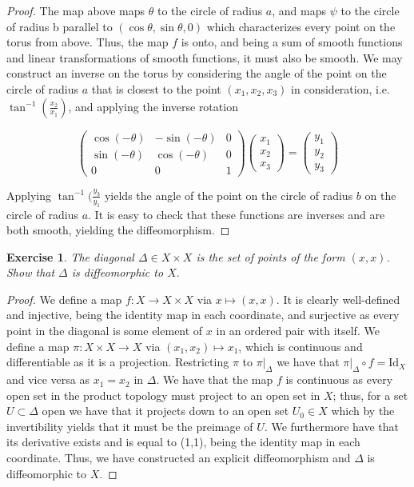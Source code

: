 \documentclass{article}
\newtheorem{exercise}{Exercise}
\begin{document}
\begin{proof}
    The map above maps $\theta$ to the circle of radius $a$, and maps $\psi$ to the circle of radius b parallel to $(\cos\theta, \sin\theta, 0)$ which characterizes every point on the torus from above. Thus, the map $f$ is onto, and being a sum of smooth functions and linear transformations of smooth functions, it must also be smooth. We may construct an inverse on the torus by considering the angle of the point on the circle of radius $a$ that is closest to the point $(x_{1},x_{2},x_{3})$ in consideration, i.e. $\tan^{-1}(\frac{x_{2}}{x_{1}})$, and applying the inverse rotation

    \[ \begin{pmatrix}  \cos(-\theta) & -\sin(-\theta) & 0 \\ \sin(-\theta) & \cos(-\theta) & 0 \\  0 & 0 & 1 \end{pmatrix} \begin{pmatrix}x_{1} \\ x_{2} \\ x_{3} \end{pmatrix} = \begin{pmatrix} y_{1} \\ y_{2} \\ y_{3} \end{pmatrix}\]

Applying $\tan^{-1}(\frac{y_{3}}{y_{1}}$ yields the angle of the point on the circle of radius $b$ on the circle of radius $a$. It is easy to check that these functions are inverses and are both smooth, yielding the diffeomorphism.    
    \end{proof}
  
\begin{exercise}
The diagonal $\Delta \in X\times X$ is the set of points of the form $(x,x)$. Show that $\Delta$ is diffeomorphic to $X.$
  \end{exercise}

  \begin{proof}
    We define a map $f: X \to X \times X$ via $x \mapsto (x,x)$. It is clearly well-defined and injective, being the identity map in each coordinate, and surjective as every point in the diagonal is some element of $x$ in an ordered pair with itself. We define a map $\pi: X \times X \to X$ via $(x_{1},x_{2}) \mapsto x_{1}$, which is continuous and differentiable as it is a projection. Restricting $\pi$ to $\pi|_{\Delta}$ we have that $\pi|_{\Delta}\circ f = \text{Id}_{X}$ and vice versa as $x_{1} = x_{2}$ in $\Delta$. We have that the map $f$ is continuous as every open set in the product topology must project to an open set in $X$; thus, for a set $U \subset \Delta$ open we have that it projects down to an open set $U_{0} \in X$ which by the invertibility yields that it must be the preimage of $U$. We furthermore have that its derivative exists and is equal to (1,1), being the identity map in each coordinate. Thus, we have constructed an explicit diffeomorphism and $\Delta$ is diffeomorphic to $X$.  
    \end{proof}
\end{document}
